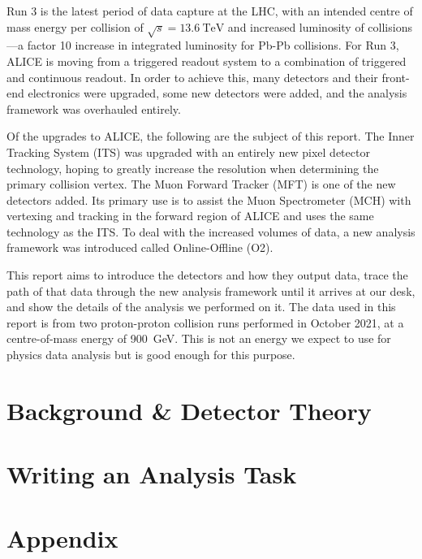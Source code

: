 \documentclass[11pt]{article}
\numberwithin{equation}{section}
\numberwithin{figure}{section}
\numberwithin{table}{section}
\begin{document}
Run 3 is the latest period of data capture at the LHC, with an intended centre of mass energy per collision of $\sqrt{s}=\SI{13.6}{\tera\electronvolt}$ and increased luminosity of collisions---a factor 10 increase in integrated luminosity for Pb-Pb collisions. For Run 3, ALICE is moving from a triggered readout system to a combination of triggered and continuous readout. In order to achieve this, many detectors and their front-end electronics were upgraded, some new detectors were added, and the analysis framework was overhauled entirely. 

Of the upgrades to ALICE, the following are the subject of this report. The Inner Tracking System (ITS) was upgraded with an entirely new pixel detector technology, hoping to greatly increase the resolution when determining the primary collision vertex. The Muon Forward Tracker (MFT) is one of the new detectors added. Its primary use is to assist the Muon Spectrometer (MCH) with vertexing and tracking in the forward region of ALICE and uses the same technology as the ITS. To deal with the increased volumes of data, a new analysis framework was introduced called Online-Offline (O2). 

This report aims to introduce the detectors and how they output data, trace the path of that data through the new analysis framework until it arrives at our desk, and show the details of the analysis we performed on it. The data used in this report is from two proton-proton collision runs performed in October 2021, at a centre-of-mass energy of \SI{900}{\giga\electronvolt}. This is not an energy we expect to use for physics data analysis but is good enough for this purpose.

\section{Background \& Detector Theory}\label{sec:Background_Detector}


\section{Writing an Analysis Task}\label{sec:AnalysisTask}



\newpage
\printbibliography

\newpage
\section*{Appendix}
\appendix

\end{document}

